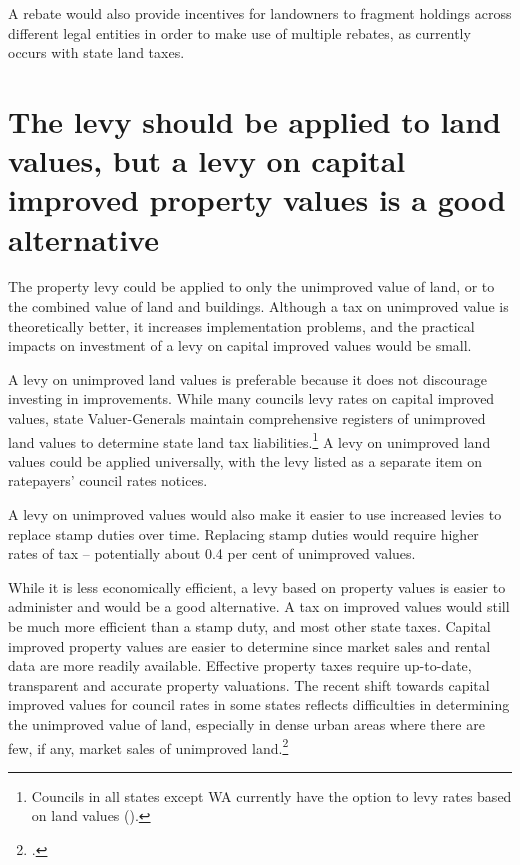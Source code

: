 \documentclass[twoside,english]{grattanBudgetRepairb5portrait}
\begin{document}
A rebate would also provide incentives for landowners to fragment holdings across different legal entities in order to make use of multiple rebates, as currently occurs with state land taxes.

\section{\label{sec:PROP-6-3}The levy should be applied to land values, but a levy on capital improved property values is a good alternative}
The property levy could be applied to only the unimproved value of land, or to the combined value of land and buildings. Although a tax on unimproved value is theoretically better, it increases implementation problems, and the practical impacts on investment of a levy on capital improved values would be small. \enlargethispage{0.5\baselineskip}

A levy on unimproved land values is preferable because it does not discourage investing in improvements. While many councils levy rates on capital improved values, state Valuer-Generals maintain comprehensive registers of unimproved land values to determine state land tax liabilities.\footnote{Councils in all states except WA currently have the option to levy rates based on land values ().}  A levy on unimproved land values could be applied universally, with the levy listed as a separate item on ratepayers’ council rates notices.

A levy on unimproved values would also make it easier to use increased levies to replace stamp duties over time. Replacing stamp duties would require higher rates of tax – potentially about 0.4 per cent of unimproved values. 

While it is less economically efficient, a levy based on property values is easier to administer and would be a good alternative. A tax on improved values would still be much more efficient than a stamp duty, and most other state taxes. Capital improved property values are easier to determine since market sales and rental data are more readily available. Effective property taxes require up-to-date, transparent and accurate property valuations. The recent shift towards capital improved values for council rates in some states reflects difficulties in determining the unimproved value of land, especially in dense urban areas where there are few, if any, market sales of unimproved land.\footcites[][24]{Ombudsman2005}[][153]{HefferanBoyd2010}
\end{document}
